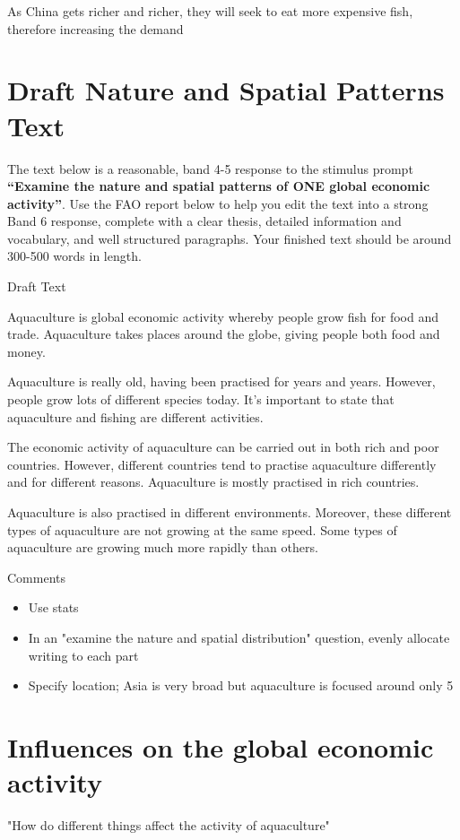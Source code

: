 		As China gets richer and richer, they will seek to eat more expensive fish, therefore increasing the demand

\section{Draft Nature and Spatial Patterns Text} \label{4/11/2024 - 6/11/2024}
	The text below is a reasonable, band 4-5 response to the stimulus prompt \textbf{“Examine the nature and spatial patterns of ONE global economic activity”}. Use the FAO report below to help you edit the text into a strong Band 6 response, complete with a clear thesis, detailed information and vocabulary, and well structured paragraphs.  Your finished text should be around 300-500 words in length. 

	{\large Draft Text}

	Aquaculture is global economic activity whereby people grow fish for food and trade. Aquaculture takes places around the globe, giving people both food and money. 

	Aquaculture is really old, having been practised for years and years. However, people grow lots of different species today. It's important to state that aquaculture and fishing are different activities.

	The economic activity of aquaculture can be carried out in both rich and poor countries. However, different countries tend to practise aquaculture differently and for different reasons. Aquaculture is mostly practised in rich countries. 

	Aquaculture is also practised in different environments. Moreover, these different types of aquaculture are not growing at the same speed. Some types of aquaculture are growing much more rapidly than others. 

	{\large Comments}
	\begin{itemize}
		\item Use stats
		\item In an "examine the nature and spatial distribution" question, evenly allocate writing to each part
		\item Specify location; Asia is very broad but aquaculture is focused around only 5
	\end{itemize}

\section{Influences on the global economic activity} \label{8/11/2024}
	"How do different things affect the activity of aquaculture"

